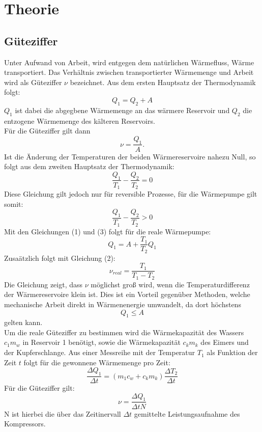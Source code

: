 \section{Theorie}
\subsection{Güteziffer}
Unter Aufwand von Arbeit, wird entgegen dem natürlichen Wärmefluss, Wärme transportiert.
Das Verhältnis zwischen transportierter Wärmemenge und Arbeit wird als Güteziffer $\nu$
bezeichnet. Aus dem ersten Hauptsatz der Thermodynamik folgt:
\begin{equation}
  Q_1 = Q_2 + A
\end{equation}
$Q_1$ ist dabei die abgegbene Wärmemenge an das wärmere Reservoir und $Q_2$ die
entzogene Wärmemenge des kälteren Reservoirs. \\
Für die Güteziffer gilt dann
\begin{equation}
  \nu = \frac{Q_1}{A} .
\end{equation}
Ist die Änderung der Temperaturen der beiden Wärmereservoire nahezu Null, so folgt
aus dem zweiten Hauptsatz der Thermodynamik:
\begin{equation}
  \frac{Q_1}{T_1} - \frac{Q_2}{T_2} = 0
\end{equation}
Diese Gleichung gilt jedoch nur für reversible Prozesse, für die Wärmepumpe gilt somit:
\begin{equation}
  \frac{Q_1}{T_1} - \frac{Q_2}{T_2} > 0
\end{equation}
Mit den Gleichungen (1) und (3) folgt für die reale Wärmepumpe:
\begin{equation}
  Q_1 = A + \frac{T_1}{T_2}Q_1
\end{equation}
Zusaätzlich folgt mit Gleichung (2):
\begin{equation}
  \nu_{real} = \frac{T_1}{T_1 - T_2}
\end{equation}
Die Gleichung zeigt, dass $\nu$ möglichst groß wird, wenn die Temperaturdifferenz
der Wärmereservoire klein ist. Dies ist ein Vorteil gegenüber Methoden, welche
mechanische Arbeit direkt in Wärmenenergie umwandelt, da dort höchstens
\begin{equation}
  Q_1 \leq A
\end{equation}
gelten kann. \\
Um die reale Güteziffer zu bestimmen wird die Wärmekapazität des Wassers $c_1m_w$ in Reservoir 1 benötigt,
sowie die Wärmekapazität $c_km_k$ des Eimers und der Kupferschlange. Aus einer Messreihe mit der Temperatur
$T_1$ als Funktion der Zeit $t$ folgt für die gewonnene Wärmemenge pro Zeit:
\begin{equation}
  \frac{\Delta Q_1}{\Delta t} = (m_1 c_w+ c_k m_k) \frac{\Delta T_2}{\Delta t}
\end{equation}
Für die Güteziffer gilt:
\begin{equation}
  \nu = \frac{\Delta Q_1}{\Delta t N}
\end{equation}
N ist hierbei die über das Zeitinervall $\Delta t$ gemittelte Leistungsaufnahme des Kompressors.


